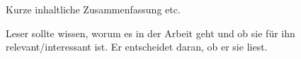 
Kurze inhaltliche Zusammenfassung \gls{etc.}

Leser sollte wissen, worum es in der Arbeit geht und ob sie für ihn relevant/interessant ist. Er entscheidet daran, ob er sie liest.

